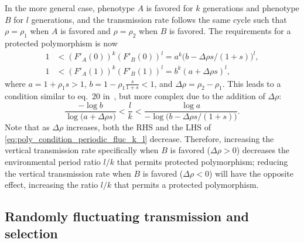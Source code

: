 \documentclass[12pt]{extarticle} %
\begin{document}
In the more general case, phenotype $A$ is favored for $k$ generations and phenotype $B$ for $l$ generations, and the transmission rate follows the same cycle such that $\rho=\rho_1$ when $A$ is favored and $\rho=\rho_2$ when $B$ is favored.
The requirements for a protected polymorphism is now
\begin{equation}\begin{aligned}
1 &< (F'_A(0))^k (F'_B(0))^l = a^k \big(b-\Delta \rho s/(1+s)\big)^l,\\
1 &< (F'_A(1))^k (F'_B(1))^l = b^k (a+\Delta \rho s)^l,
\end{aligned}\end{equation}
where $a=1+\rho_1 s>1$, $b=1-\rho_1\frac{s}{1+s}<1$, and $\Delta \rho = \rho_2 - \rho_1$.
This leads to a condition similar to eq.~20 in~\citet{Ram2018}, but more complex due to the addition of $\Delta \rho$:
\begin{equation} \label{eq:poly_condition_periodic_fluc_k_l}
\frac{-\log{b}}{\log{\big(a+\Delta \rho s\big)}} < 
\frac{l}{k} < 
\frac{\log{a}}{-\log{\big(b-\Delta \rho s/(1+s)\big)}}.
\end{equation}
Note that as $\Delta \rho$ increases, both the RHS and the LHS of \eqref{eq:poly_condition_periodic_fluc_k_l} decrease.
Therefore, increasing the vertical transmission rate specifically when $B$ is favored ($\Delta \rho>0$) decreases the environmental period ratio $l/k$ that permits protected polymorphism; reducing the vertical transmission rate when $B$ is favored ($\Delta \rho<0$) will have the opposite effect, increasing the ratio $l/k$ that permits a protected polymorphism.

\subsection*{Randomly fluctuating transmission and selection}
\end{document}
